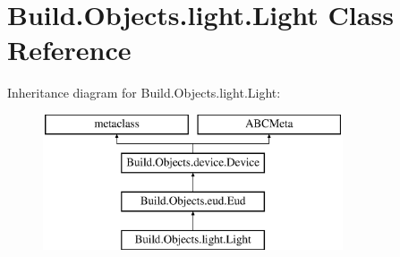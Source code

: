 \hypertarget{class_build_1_1_objects_1_1light_1_1_light}{}\section{Build.\+Objects.\+light.\+Light Class Reference}
\label{class_build_1_1_objects_1_1light_1_1_light}
Inheritance diagram for Build.\+Objects.\+light.\+Light\+:\begin{figure}[H]
\begin{center}
\leavevmode
\includegraphics[height=4.000000cm]{class_build_1_1_objects_1_1light_1_1_light}
\end{center}
\end{figure}

